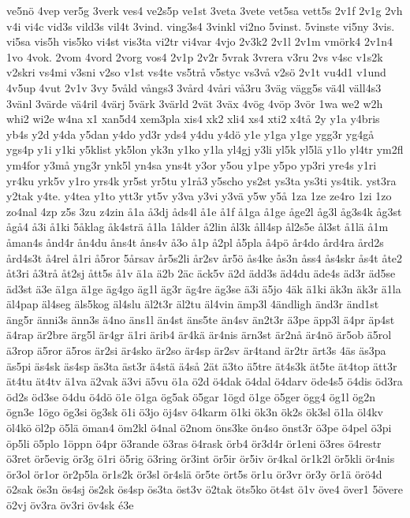 {ve5nö
4vep
ver5g
3verk
ves4
ve2s5p
ve1st
3veta
3vete
vet5sa
vett5s
2v1f
2v1g
2vh
v4i
vi4c
vid3s
vild3s
vil4t
3vind.
ving3s4
3vinkl
vi2no
5vinst.
5vinste
vi5ny
3vis.
vi5sa
vis5h
vis5ko
vi4st
vis3ta
vi2tr
vi4var
4vjo
2v3k2
2v1l
2v1m
vmörk4
2v1n4
1vo
4vok.
2vom
4vord
2vorg
vos4
2v1p
2v2r
5vrak
3vrera
v3ru
2vs
v4sc
v1s2k
v2skri
vs4mi
v3sni
v2so
v1st
vs4te
vs5trå
v5styc
vs3vå
v2sö
2v1t
vu4d1
v1und
4v5up
4vut
2v1v
3vy
5våld
vångs3
3vård
4våri
vå3ru
3väg
vägg5s
vä4l
väll4s3
3vänl
3värde
vä4ril
4värj
5värk
3värld
2vät
3väx
4vög
4vöp
3vör
1wa
we2
w2h
whi2
wi2e
w4na
x1
xan5d4
xem3pla
xis4
xk2
xli4
xs4
xti2
x4tå
2y
y1a
y4bris
yb4s
y2d
y4da
y5dan
y4do
yd3r
yds4
y4du
y4dö
y1e
y1ga
y1ge
ygg3r
yg4gå
ygs4p
y1i
y1ki
y5klist
yk5lon
yk3n
y1ko
y1la
yl4gj
y3li
yl5k
yl5lä
y1lo
yl4tr
ym2fl
ym4for
y3må
yng3r
ynk5l
yn4sa
yns4t
y3or
y5ou
y1pe
y5po
yp3ri
yre4s
y1ri
yr4ku
yrk5v
y1ro
yrs4k
yr5st
yr5tu
y1rå3
y5scho
ys2st
ys3ta
ys3ti
ys4tik.
yst3ra
y2tak
y4te.
y4tea
y1to
ytt3r
yt5v
y3va
y3vi
y3vä
y5w
y5å
1za
1ze
ze4ro
1zi
1zo
zo4nal
4zp
z5s
3zu
z4zin
å1a
å3dj
åds4l
å1e
å1f
å1ga
å1ge
åge2l
åg3l
åg3s4k
åg3st
ågå4
å3i
å1ki
5åklag
åk4strä
å1la
1ålder
å2lin
ål3k
åll4sp
ål2s5e
ål3st
å1lä
å1m
åman4s
ånd4r
ån4du
åns4t
åns4v
å3o
å1p
å2pl
å5pla
å4pö
år4do
ård4ra
ård2s
ård4s3t
å4rel
å1ri
å5ror
5årsav
år5s2li
år2sv
år5ö
ås4ke
ås3n
åss4
ås4skr
ås4t
åte2
åt3ri
å3trå
åt2sj
ått5s
å1v
ä1a
ä2b
2äc
äck5v
ä2d
ädd3s
äd4du
äde4s
äd3r
äd5se
äd3st
ä3e
ä1ga
ä1ge
äg4go
äg1l
äg3r
äg4re
äg3se
ä3i
ä5jo
4äk
ä1ki
äk3n
äk3r
ä1la
äl4pap
äl4seg
äls5kog
äl4slu
äl2t3r
äl2tu
äl4vin
ämp3l
4ändligh
änd3r
änd1st
äng5r
änni3s
änn3s
ä4no
äns1l
än4st
äns5te
än4sv
än2t3r
ä3pe
äpp3l
ä4pr
äp4st
ä4rap
är2bre
ärg5l
är4gr
ä1ri
ärib4
är4kä
är4nis
ärn3st
är2nå
är4nö
är5ob
ä5rol
ä3rop
ä5ror
ä5ros
är2si
är4sko
är2so
är4sp
är2sv
är4tand
är2tr
ärt3s
4äs
äs3pa
äs5pi
äs4sk
äs4sp
äs3ta
äst3r
ä4stä
ä4så
2ät
ä3to
ä5tre
ät4s3k
ät5te
ät4top
ätt3r
ät4tu
ät4tv
ä1va
ä2vak
ä3vi
ä5vu
ö1a
ö2d
ö4dak
ö4dal
ö4darv
öde4s5
ö4dis
öd3ra
öd2s
öd3se
ö4du
ö4dö
ö1e
ö1ga
ög5ak
ö5gar
1ögd
ö1ge
ö5ger
ögg4
ög1l
ög2n
ögn3e
1ögo
ög3si
ög3sk
ö1i
ö3jo
öj4sv
ö4karm
ö1ki
ök3n
ök2s
ök3sl
ö1la
öl4kv
öl4kö
öl2p
ö5lä
öman4
öm2kl
ö4nal
ö2nom
öns3ke
ön4so
önst3r
ö3pe
ö4pel
ö3pi
öp5li
ö5plo
1öppn
ö4pr
ö3rande
ö3ras
ö4rask
örb4
ör3d4r
ör1eni
ö3res
ö4restr
ö3ret
ör5evig
ör3g
ö1ri
ö5rig
ö3ring
ör3int
ör5ir
ör5iv
ör4kal
ör1k2l
ör5kli
ör4nis
ör3ol
ör1or
ör2p5la
ör1s2k
ör3sl
ör4slä
ör5te
ört5s
ör1u
ör3vr
ör3y
ör1ä
örö4d
ö2sak
ös3n
ös4sj
ös2sk
ös4sp
ös3ta
öst3v
ö2tak
öts5ko
öt4st
ö1v
öve4
över1
5övere
ö2vj
öv3ra
öv3ri
öv4sk
é3e
}
